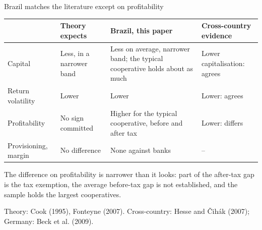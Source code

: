 \documentclass[aspectratio=169,10pt]{beamer}
\begin{document}
\begin{frame}{Brazil matches the literature except on profitability}
\vspace{0.1cm}
{\footnotesize\renewcommand{\arraystretch}{1.35}\setlength{\tabcolsep}{4pt}
\begin{tabular}{>{\raggedright\arraybackslash}p{2.3cm}>{\raggedright\arraybackslash}p{2.8cm}>{\raggedright\arraybackslash}p{4.4cm}>{\raggedright\arraybackslash}p{3.3cm}}
\toprule
& \textbf{Theory expects} & \textbf{Brazil, this paper} & \textbf{Cross-country evidence}\\
\midrule
Capital & Less, in a narrower band & Less on average, narrower band; the typical cooperative holds about as much & Lower capitalisation: \textcolor{coop}{agrees}\\
Return volatility & Lower & Lower & Lower: \textcolor{coop}{agrees}\\
Profitability & No sign committed & Higher for the typical cooperative, before and after tax & Lower: \textcolor{bank}{differs}\\
Provisioning, margin & No difference & None against banks & --\\
\bottomrule
\end{tabular}\par}
\vspace{0.3cm}
{\small The difference on profitability is narrower than it looks: part of the after-tax gap is the tax exemption, the average before-tax gap is not established, and the sample holds the largest cooperatives.\par}
\vspace{0.15cm}
{\scriptsize\color{muted}Theory: Cook (1995), Fonteyne (2007). Cross-country: Hesse and \v{C}ih\'ak (2007); Germany: Beck et al. (2009).\par}
\end{frame}
\end{document}
